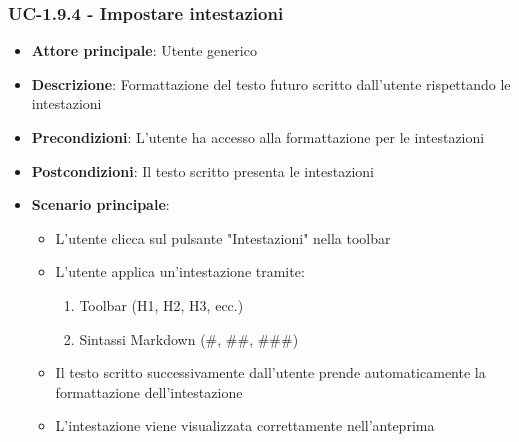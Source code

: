 \documentclass[11pt,a4paper]{article}
\begin{document}
\subsubsection{UC-1.9.4 - Impostare intestazioni}
\begin{itemize}
    \item \textbf{Attore principale}: Utente generico
    \item \textbf{Descrizione}: Formattazione del testo futuro scritto dall’utente rispettando le intestazioni
    \item \textbf{Precondizioni}: L’utente ha accesso alla formattazione per le intestazioni
    \item \textbf{Postcondizioni}: Il testo scritto presenta le intestazioni
    \item \textbf{Scenario principale}:
        \begin{itemize}
            \item L’utente clicca sul pulsante "Intestazioni" nella toolbar
            \item L’utente applica un’intestazione tramite:
                \begin{enumerate}
                    \item Toolbar (H1, H2, H3, ecc.)
                    \item Sintassi Markdown (\#, \#\#, \#\#\#)
                \end{enumerate}
            \item Il testo scritto successivamente dall'utente prende automaticamente la formattazione dell'intestazione
            \item L'intestazione viene visualizzata correttamente nell'anteprima
        \end{itemize}
\end{itemize}
\end{document}
